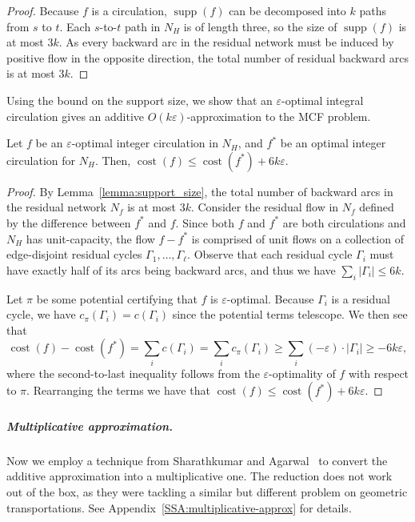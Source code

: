\documentclass[a4paper,UKenglish]{socg-lipics-v2018}
\def\eps{\varepsilon}
\def\cost{\operatorname{cost}}
\def\supp{\operatorname{supp}}
\theoremstyle{plain}
\numberwithin{figure}{section}
\renewcommand{\paragraph}{\subparagraph}
\begin{document}
\begin{proof}
Because $f$ is a circulation, $\supp(f)$ can be decomposed into $k$  paths from $s$ to $t$.
Each $s$-to-$t$ path in $N_H$ is of length three, so the size of $\supp(f)$ is at most $3k$.
As every backward arc in the residual network must be induced by positive flow in the opposite direction,
the total number of residual backward arcs is at most $3k$.
\end{proof}

Using the bound on the support size, we show that an $\eps$-optimal integral circulation gives an additive $O(k\eps)$-approximation to the MCF problem.

\begin{lemmarep}
\label{lemma:goldberg_cost_add}
Let $f$ be an $\eps$-optimal integer circulation in $N_H$, and $f^*$ be an optimal integer circulation for $N_H$.
Then, $\cost(f) \leq \cost(f^*) + 6k\eps$.
\end{lemmarep}

\begin{proof}
By Lemma~\ref{lemma:support_size}, the total number of backward arcs in the residual network $N_f$ is at most $3k$.
%
Consider the residual flow in $N_f$ defined by the difference between $f^*$ and $f$.
Since both $f$ and $f^*$ are both circulations and $N_H$ has unit-capacity,
the flow $f - f^*$ is comprised of unit flows on a collection of edge-disjoint residual cycles $\Gamma_1, \ldots, \Gamma_\ell$.
Observe that each residual cycle $\Gamma_i$ must have exactly half of its arcs being backward arcs, and thus we have $\sum_i |\Gamma_i| \leq 6k$.

Let $\pi$ be some potential certifying that $f$ is $\eps$-optimal.
Because $\Gamma_i$ is a residual cycle, we have $c_\pi(\Gamma_i) = c(\Gamma_i)$ since the potential terms telescope.
We then see that
\[
	\cost(f) - \cost(f^*)
	= \sum_i c(\Gamma_i)
	= \sum_i c_\pi(\Gamma_i)
	\geq \sum_i (-\eps) \cdot |\Gamma_i|
	\geq -6k\eps,
\]
where the second-to-last inequality follows from the $\eps$-optimality of $f$
with respect to $\pi$.
Rearranging the terms we have that $\cost(f) \leq \cost(f^*) + 6k\eps$.
\end{proof}



\paragraph{Multiplicative approximation.}
Now we employ a technique from Sharathkumar and Agarwal~\cite{SA12} to convert the additive approximation into a multiplicative one.
The reduction does not work out of the box, as they were tackling a similar but different problem on geometric transportations.
See Appendix~\ref{SSA:multiplicative-approx} for details.
\end{document}
